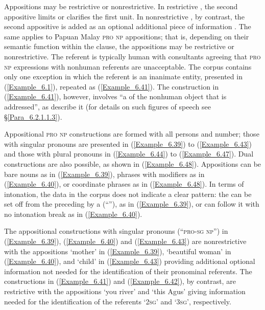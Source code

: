 Appositions may be restrictive or nonrestrictive. In restrictive , the second appositive limits or clarifies the first unit. In nonrestrictive , by contrast, the second appositive is added as an optional additional piece of information \citep[182–188]{Morley.2000}. The same applies to Papuan Malay \textsc{pro} \textsc{np} appositions; that is, depending on their semantic function within the clause, the appositions may be restrictive or nonrestrictive. The referent is typically human with consultants agreeing that \textsc{pro} \textsc{np} expressions with nonhuman referents are unacceptable. The corpus contains only one exception in which the referent is an inanimate entity, presented in (\ref{Example_6.1}), repeated as (\ref{Example_6.41}). The construction in (\ref{Example_6.41}), however, involves “a \textit{ }of the nonhuman object that is addressed”, as \citet[314]{Abrams.2009} describe it (for details on such figures of speech see §\ref{Para_6.2.1.1.3}).



Appositional \textsc{pro} \textsc{np} constructions are formed with all persons and number; those with singular pronouns are presented in (\ref{Example_6.39}) to (\ref{Example_6.43}) and those with plural pronouns in (\ref{Example_6.44}) to (\ref{Example_6.47}). Dual constructions are also possible, as shown in (\ref{Example_6.48}). Appositions can be bare nouns as in (\ref{Example_6.39}),  phrases with modifiers as in (\ref{Example_6.40}), or coordinate  phrases as in (\ref{Example_6.48}). In terms of intonation, the data in the corpus does not indicate a clear pattern: the  can be set off from the preceding  by a  (“{\textbar}”), as in (\ref{Example_6.39}), or can follow it with no intonation break as in (\ref{Example_6.40}).



The appositional constructions with singular pronouns (``\textsc{pro-sg} \textsc{np}'') in (\ref{Example_6.39}), (\ref{Example_6.40}) and (\ref{Example_6.43}) are nonrestrictive with the appositions  ‘mother’ in (\ref{Example_6.39}),  ‘beautiful woman’ in (\ref{Example_6.40}), and  ‘child’ in (\ref{Example_6.43}) providing additional optional information not needed for the identification of their pronominal referents. The constructions in (\ref{Example_6.41}) and (\ref{Example_6.42}), by contrast, are restrictive with the appositions  ‘you river’ and  ‘this Agus’ giving information needed for the identification of the referents  ‘\textsc{2sg}’ and  ‘\textsc{3sg}’, respectively.



